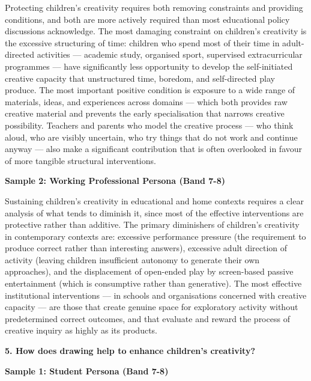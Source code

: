 Protecting children's creativity requires both removing constraints and providing conditions, and both are more actively required than most educational policy discussions acknowledge. The most damaging constraint on children's creativity is the excessive structuring of time: children who spend most of their time in adult-directed activities — academic study, organised sport, supervised extracurricular programmes — have significantly less opportunity to develop the self-initiated creative capacity that unstructured time, boredom, and self-directed play produce. The most important positive condition is exposure to a wide range of materials, ideas, and experiences across domains — which both provides raw creative material and prevents the early specialisation that narrows creative possibility. Teachers and parents who model the creative process — who think aloud, who are visibly uncertain, who try things that do not work and continue anyway — also make a significant contribution that is often overlooked in favour of more tangible structural interventions.

\textbf{Sample 2: Working Professional Persona (Band 7-8)}

Sustaining children's creativity in educational and home contexts requires a clear analysis of what tends to diminish it, since most of the effective interventions are protective rather than additive. The primary diminishers of children's creativity in contemporary contexts are: excessive performance pressure (the requirement to produce correct rather than interesting answers), excessive adult direction of activity (leaving children insufficient autonomy to generate their own approaches), and the displacement of open-ended play by screen-based passive entertainment (which is consumptive rather than generative). The most effective institutional interventions — in schools and organisations concerned with creative capacity — are those that create genuine space for exploratory activity without predetermined correct outcomes, and that evaluate and reward the process of creative inquiry as highly as its products.

\separator

\begin{ieltsquestion}
\textbf{5. How does drawing help to enhance children's creativity?}
\end{ieltsquestion}
\textbf{Sample 1: Student Persona (Band 7-8)}

